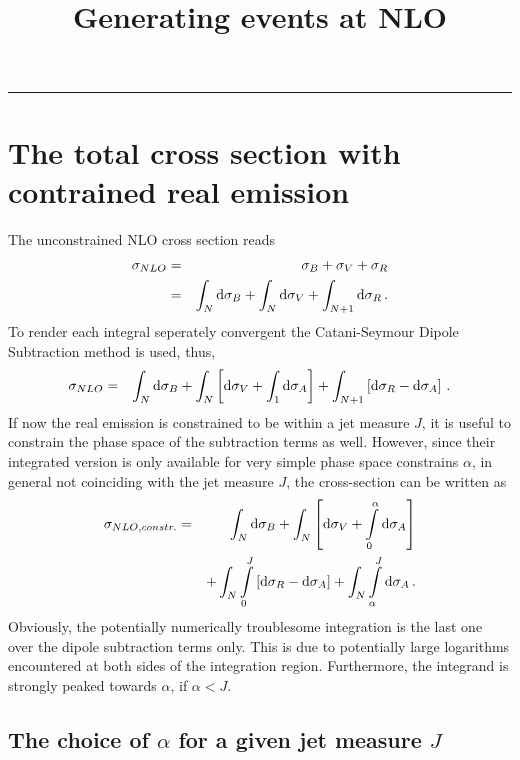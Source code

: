 \documentclass[a4paper,10pt]{scrartcl}
\title{Generating events at NLO}
\date{}
\newcommand{\done}{{\rm d}}
\newcommand{\nnb}{\nonumber}
\begin{document}
\maketitle
\tableofcontents
\vspace{2mm}
\hrule
\vspace{5mm}

\section{The total cross section with contrained real emission}

The unconstrained NLO cross section reads
\begin{eqnarray}
 \sigma_{NLO}
& = & \sigma_B + \sigma_V + \sigma_R \nnb\\
& = & \int_N\done\sigma_B
	+ \int_N\done\sigma_V
	+ \int_{N+1}\done\sigma_R \,.
\end{eqnarray}
To render each integral seperately convergent the Catani-Seymour
Dipole Subtraction method is used, thus,
\begin{eqnarray}
 \sigma_{NLO}
& = & \int_N\done\sigma_B
	+ \int_N\left[\done\sigma_V+\int_1\done\sigma_A\right]
	+ \int_{N+1}\left[\done\sigma_R-\done\sigma_A\right] \,.
\end{eqnarray}
If now the real emission is constrained to be within a jet measure $J$,
it is useful to constrain the phase space of the subtraction terms as well.
However, since their integrated version is only available for very simple
phase space constrains $\alpha$, in general not coinciding with the jet
measure $J$, the cross-section can be written as 
\begin{eqnarray}
 \sigma_{NLO,constr.}
& = & \int_N\done\sigma_B
	+ \int_N\left[\done\sigma_V+\int\limits_0^\alpha\done\sigma_A\right] \nnb\\
&&	+ \int_N\int\limits_0^J\left[\done\sigma_R-\done\sigma_A\right]
	+ \int_N\int\limits_\alpha^J\done\sigma_A \,.
\end{eqnarray}
Obviously, the potentially numerically troublesome integration is the last
one over the dipole subtraction terms only. This is due to potentially large
logarithms encountered at both sides of the integration region. Furthermore,
the integrand is strongly peaked towards $\alpha$, if $\alpha < J$.

\subsection{The choice of $\alpha$ for a given jet measure $J$}
\end{document}
